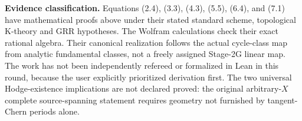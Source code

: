 \documentclass[11pt]{article}
\begin{document}
\noindent\textbf{Evidence classification.}
Equations (2.4), (3.3), (4.3), (5.5), (6.4), and (7.1)
have mathematical proofs above under their stated
standard scheme, topological K-theory and GRR hypotheses.
The Wolfram calculations check their exact rational algebra.
Their canonical realization follows the actual cycle-class map
from analytic fundamental classes, not a freely assigned
Stage-2G linear map. The work has not been independently
refereed or formalized in Lean in this round, because the
user explicitly prioritized derivation first.
The two universal Hodge-existence implications are not
declared proved: the original arbitrary-\(X\) complete
source-spanning statement requires geometry not furnished
by tangent-Chern periods alone.
\end{document}
